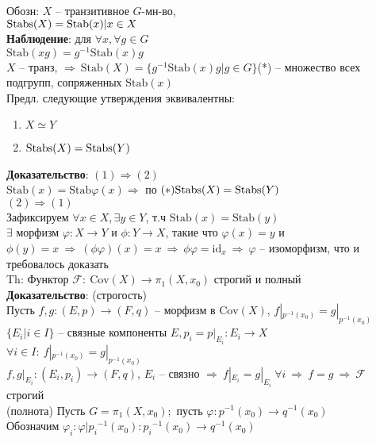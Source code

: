 	Обозн: $X$ -- транзитивное $G$-мн-во,\\
	$\text{\text{Stabs}}(X) = \text{Stab}(x)|x \in X$\\
	\textbf{Наблюдение}: для $\forall x, \forall g \in G$\\
	$\text{Stab}(xg) = g^{-1}\text{Stab}(x)g$\\
	$X$ -- транз, $\Rightarrow\ \text{Stab}(X) = \{g^{-1}\text{Stab}(x)g|g \in G\}$(*) -- множество всех подгрупп, сопряженных $\text{Stab}(x)$\\
	Предл. следующие утверждения эквивалентны:\\
	\begin{enumerate}
	\item $X \simeq Y$
	\item $\text{\text{Stabs}}(X) = \text{\text{Stabs}}(Y)$
	\end{enumerate}
	\textbf{Доказательство}: $(1) \Rightarrow (2)$\\
	$\text{Stab}(x) = \text{Stab}\varphi(x) \Rightarrow$ по $(*) \text{\text{Stabs}}(X) = \text{\text{Stabs}}(Y)$\\
	$(2) \Rightarrow (1)$\\
	Зафиксируем $\forall x \in X, \exists y \in Y$, т.ч $\text{Stab}(x) = \text{Stab}(y)$\\
	$\exists$ морфизм $\varphi: X \rightarrow Y$ и $\phi: Y \rightarrow X$, такие что $\varphi(x) = y$ и $\phi(y) = x\ \Rightarrow\ (\phi \varphi)(x) = x\ \Rightarrow\ \phi \varphi =  \text{id}_x\ \Rightarrow\ \varphi$ -- изоморфизм, что и требовалось доказать\\
	Th: Функтор $\mathcal{F}: \ \text{Cov}(X)\rightarrow {\pi}_1 (X, x_0)$ строгий и полный\\
	\textbf{Доказательство}: (строгость)\\
	Пусть $f, g: (E,p) \rightarrow (F,q)$ -- морфизм в $\text{Cov}(X)$, $f|_{p^{-1}(x_0)} = g|_{p^{-1}(x_0)}$\\
	$\{E_{i}|i \in I\}$ -- связные компоненты $E, p_i = p|_{E_i}: E_i \rightarrow X$\\
	$\forall i \in I: \ f|_{p^{-1}(x_0)} = g|_{p^{-1}(x_0)}$\\
	$f,g|_{E_i}: (E_i,p_i) \rightarrow (F,q)$, $E_i$ -- связно $\Rightarrow\ f|_{E_i} = g|_{E_i}\ \forall i\ \Rightarrow\ f = g\ \Rightarrow\ \mathcal{F}$ строгий\\
	(полнота) Пусть $G = {\pi}_1 (X, x_0);$ пусть $\varphi: p^{-1}(x_0) \rightarrow q^{-1}(x_0)$\\
	Обозначим $\varphi_i: \varphi|{p_i}^{-1}(x_0): {p_i}^{-1}(x_0) \rightarrow q^{-1}(x_0)$\\
